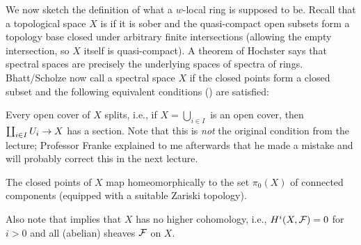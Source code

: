 We now sketch the definition of what a $w$-local ring is supposed to be. Recall that a topological space $X$ is  if it is sober and the quasi-compact open subsets form a topology base closed under arbitrary finite intersections (allowing the empty intersection, so $X$ itself is quasi-compact). A theorem of Hochster says that  spectral spaces are precisely the underlying spaces of spectra of rings. Bhatt/Scholze now call a spectral space $X$  if the closed points form a closed subset and the following equivalent conditions (\cite[Lemma~2.1.4]{proetale}) are satisfied:
\begin{alphanumerate}
	\item Every open cover of $X$ splits, i.e., if $X=\bigcup_{i\in I}$ is an open cover, then $\coprod_{i\in I}U_i\morphism X$ has a section. Note that this is \emph{not} the original condition from the lecture; Professor Franke explained to me afterwards that he made a mistake and will probably correct this in the next lecture.
	\item The closed points of $X$ map homeomorphically to the set $\pi_0(X)$ of connected components (equipped with a suitable Zariski topology).
\end{alphanumerate}
Also note that  implies that $X$ has no higher cohomology, i.e., $H^i(X,\mathcal{F})=0$ for $i>0$ and all (abelian) sheaves $\mathcal{F}$ on $X$.

